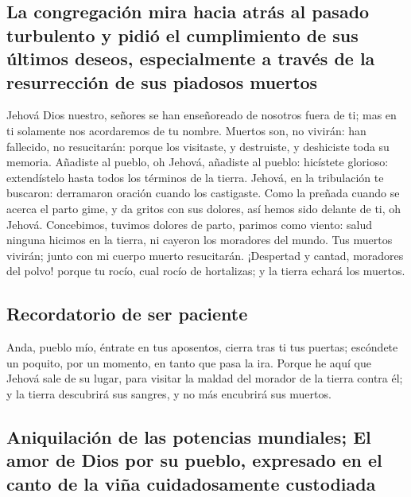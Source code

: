 \hypertarget{la-congregaciuxf3n-mira-hacia-atruxe1s-al-pasado-turbulento-y-pidiuxf3-el-cumplimiento-de-sus-uxfaltimos-deseos-especialmente-a-travuxe9s-de-la-resurrecciuxf3n-de-sus-piadosos-muertos}{%
\subsection{La congregación mira hacia atrás al pasado turbulento y
pidió el cumplimiento de sus últimos deseos, especialmente a través de
la resurrección de sus piadosos
muertos}\label{la-congregaciuxf3n-mira-hacia-atruxe1s-al-pasado-turbulento-y-pidiuxf3-el-cumplimiento-de-sus-uxfaltimos-deseos-especialmente-a-travuxe9s-de-la-resurrecciuxf3n-de-sus-piadosos-muertos}}

 Jehová Dios nuestro, señores se han enseñoreado de
nosotros fuera de ti; mas en ti solamente nos acordaremos de tu nombre.
 Muertos son, no vivirán: han fallecido, no resucitarán:
porque los visitaste, y destruiste, y deshiciste toda su memoria.
 Añadiste al pueblo, oh Jehová, añadiste al pueblo:
hicístete glorioso: extendístelo hasta todos los términos de la tierra.
 Jehová, en la tribulación te buscaron: derramaron
oración cuando los castigaste.  Como la preñada cuando se
acerca el parto gime, y da gritos con sus dolores, así hemos sido
delante de ti, oh Jehová.  Concebimos, tuvimos dolores de
parto, parimos como viento: salud ninguna hicimos en la tierra, ni
cayeron los moradores del mundo.  Tus muertos vivirán;
junto con mi cuerpo muerto resucitarán. ¡Despertad y cantad, moradores
del polvo! porque tu rocío, cual rocío de hortalizas; y la tierra echará
los muertos.

\hypertarget{recordatorio-de-ser-paciente}{%
\subsection{Recordatorio de ser
paciente}\label{recordatorio-de-ser-paciente}}

 Anda, pueblo mío, éntrate en tus aposentos, cierra tras
ti tus puertas; escóndete un poquito, por un momento, en tanto que pasa
la ira.  Porque he aquí que Jehová sale de su lugar, para
visitar la maldad del morador de la tierra contra él; y la tierra
descubrirá sus sangres, y no más encubrirá sus muertos.

\hypertarget{aniquilaciuxf3n-de-las-potencias-mundiales-el-amor-de-dios-por-su-pueblo-expresado-en-el-canto-de-la-viuxf1a-cuidadosamente-custodiada}{%
\subsection{Aniquilación de las potencias mundiales; El amor de Dios por
su pueblo, expresado en el canto de la viña cuidadosamente
custodiada}\label{aniquilaciuxf3n-de-las-potencias-mundiales-el-amor-de-dios-por-su-pueblo-expresado-en-el-canto-de-la-viuxf1a-cuidadosamente-custodiada}}

